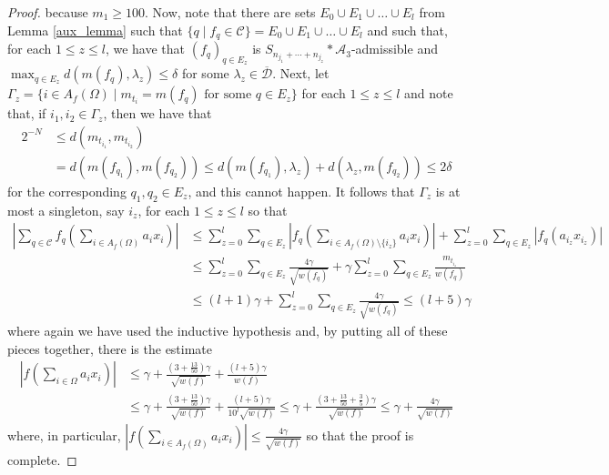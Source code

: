 \documentclass[10pt,a4paper]{amsart}
\begin{document}
\begin{proof}
because $m_{1}\geq 100$. Now, note that there are sets $E_{0}\cup E_{1}\cup\ldots\cup E_{l}$ from Lemma \ref{aux_lemma} such that $\{q \mid f_{q}\in \mathcal{C}\}=E_{0}\cup E_{1}\cup\ldots\cup E_{l}$ and such that, for each $1\leq z\leq l$, we have that $(f_{q})_{q\in E_{z}}$ is $S_{n_{j_{1}}+\cdots+n_{j_{z}}}\ast\mathcal{A}_{3}$-admissible and $\max_{q\in E_{z}}d(m(f_{q}),\lambda_{z})\leq\delta$ for some $\lambda_{z}\in\overline{\mathcal{D}}$. Next, let $\Gamma_{z}=\{ i\in A_{f}(\Omega) \mid m_{t_{i}}=m(f_{q}) \text{ for some } q\in E_{z}\}$ for each $1\leq z\leq l$ and note that, if $i_{1},i_{2}\in \Gamma_{z}$, then we have that
\begin{align*} 2^{-N} &\leq d(m_{t_{i_{1}}},m_{t_{i_{2}}}) \\ &= d(m(f_{q_{1}}),m(f_{q_{2}}))\leq d(m(f_{q_{1}}),\lambda_{z})+d(\lambda_{z},m(f_{q_{2}})) \leq 2\delta \end{align*}
for the corresponding $q_{1},q_{2}\in E_{z}$, and this cannot happen. It follows that $\Gamma_{z}$ is at most a singleton, say $i_{z}$, for each $1\leq z\leq l$ so that
\begin{align*}\left\vert \sum_{q\in\mathcal{C}}f_{q}\left(\sum_{i\in A_{f}(\Omega)}a_{i}x_{i}\right)\right\vert &\leq \sum_{z=0}^{l} \sum_{q\in E_{z}} \left\vert f_{q}\left(\sum_{i \in A_{f}(\Omega)\setminus\{i_{z}\}}a_{i}x_{i}\right)\right\vert + \sum_{z=0}^{l}\sum_{q\in E_{z}}|f_{q}(a_{i_{z}}x_{i_{z}})| \\ &\leq \sum_{z=0}^{l}\sum_{q\in E_{z}}\frac{4\gamma}{\sqrt{w(f_{q})}} + \gamma\sum_{z=0}^{l}\sum_{q\in E_{z}}\frac{m_{t_{i_{z}}}}{w(f_{q})} \\ &\leq (l+1)\gamma + \sum_{z=0}^{l}\sum_{q\in E_{z}}\frac{4\gamma}{\sqrt{w(f_{q})}} \leq (l+5)\gamma  \end{align*}
where again we have used the inductive hypothesis and, by putting all of these pieces together, there is the estimate
\begin{align*} \left\vert f\left(\sum_{i\in\Omega}a_{i}x_{i}\right)\right\vert &\leq \gamma+\frac{(3+\frac{13}{50})\gamma}{\sqrt{w(f)}}+\frac{(l+5)\gamma}{w(f)} \\ &\leq \gamma+\frac{(3+\frac{13}{50})\gamma}{\sqrt{w(f)}}+\frac{(l+5)\gamma}{10^{l}\sqrt{w(f)}} \leq \gamma + \frac{(3+\frac{13}{50}+\frac{3}{5})\gamma}{\sqrt{w(f)}} \leq \gamma+ \frac{4\gamma}{\sqrt{w(f)}}\end{align*}
where, in particular, $\left\vert f\left(\sum_{i\in A_{f}(\Omega)}a_{i}x_{i}\right)\right\vert\leq \frac{4\gamma}{\sqrt{w(f)}} $ so that the proof is complete.
\end{proof}
\end{document}
